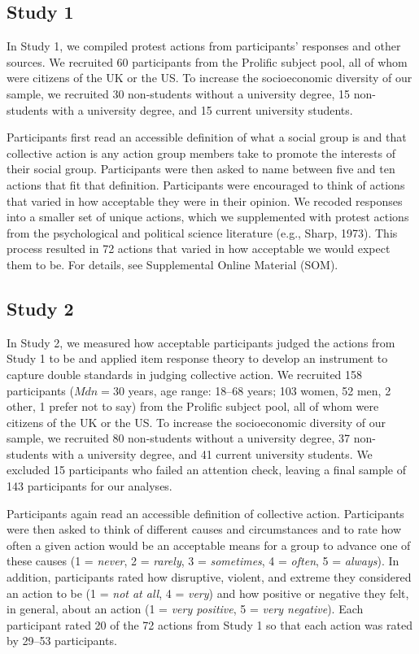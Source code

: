 \documentclass[twocolumn, 11pt, letterpaper]{article}
\begin{document}
\hypertarget{study-1}{%
\subsection{Study 1}\label{study-1}}

In Study 1, we compiled protest actions from participants' responses and
other sources. We recruited 60 participants from the Prolific subject
pool, all of whom were citizens of the UK or the US. To increase the
socioeconomic diversity of our sample, we recruited 30 non-students
without a university degree, 15 non-students with a university degree,
and 15 current university students.

Participants first read an accessible definition of what a social group
is and that collective action is any action group members take to
promote the interests of their social group. Participants were then
asked to name between five and ten actions that fit that definition.
Participants were encouraged to think of actions that varied in how
acceptable they were in their opinion. We recoded responses into a
smaller set of unique actions, which we supplemented with protest
actions from the psychological and political science literature (e.g.,
Sharp, 1973). This process resulted in 72 actions that varied in how
acceptable we would expect them to be. For details, see Supplemental
Online Material (SOM).

\hypertarget{study-2}{%
\subsection{Study 2}\label{study-2}}

In Study 2, we measured how acceptable participants judged the actions
from Study 1 to be and applied item response theory to develop an
instrument to capture double standards in judging collective action. We
recruited 158 participants (\(\textit{Mdn} = 30\) years, age range:
18--68 years; 103 women, 52 men, 2 other, 1 prefer not to say) from the
Prolific subject pool, all of whom were citizens of the UK or the US. To
increase the socioeconomic diversity of our sample, we recruited 80
non-students without a university degree, 37 non-students with a
university degree, and 41 current university students. We excluded 15
participants who failed an attention check, leaving a final sample of
143 participants for our analyses.

Participants again read an accessible definition of collective action.
Participants were then asked to think of different causes and
circumstances and to rate how often a given action would be an
acceptable means for a group to advance one of these causes (1 =
\emph{never}, 2 = \emph{rarely}, 3 = \emph{sometimes}, 4 = \emph{often},
5 = \emph{always}). In addition, participants rated how disruptive,
violent, and extreme they considered an action to be (1 = \emph{not at
all}, 4 = \emph{very}) and how positive or negative they felt, in
general, about an action (1 = \emph{very positive}, 5 = \emph{very
negative}). Each participant rated 20 of the 72 actions from Study 1 so
that each action was rated by 29--53 participants.
\end{document}
